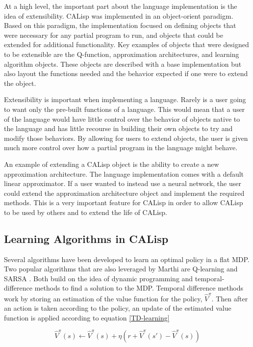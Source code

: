 \documentclass[jair,twoside,11pt,theapa]{article}
\begin{document}
At a high level, the important part about the language implementation is the idea of extensibility. CALisp was implemented in an object-orient paradigm. Based on this paradigm, the implementation focused on defining objects that were necessary for any partial program to run, and objects that could be extended for additional functionality. Key examples of objects that were designed to be extensible are the Q-function, approximation architectures, and learning algorithm objects. These objects are described with a base implementation but also layout the functions needed and the behavior expected if one were to extend the object. 

Extensibility is important when implementing a language. Rarely is a user going to want only the pre-built functions of a language. This would mean that a user of the language would have little control over the behavior of objects native to the language and has little recourse in building their own objects to try and modify those behaviors. By allowing for users to extend objects, the user is given much more control over how a partial program in the language might behave. 

An example of extending a CALisp object is the ability to create a new approximation architecture. The language implementation comes with a default linear approximator. If a user wanted to instead use a neural network, the user could extend the approximation architecture object and implement the required methods. This is a very important feature for CALisp in order to allow CALisp to be used by others and to extend the life of CALisp. 

\subsection{Learning Algorithms in CALisp}
\label{Learning}
Several algorithms have been developed to learn an optimal policy in a flat MDP. Two popular algorithms that are also leveraged by Marthi are Q-learning \cite{Watkins:1992} and SARSA \cite{Sutton:1998}. Both build on the idea of dynamic programming and temporal-difference methods to find a solution to the MDP. Temporal difference methods work by storing an estimation of the value function for the policy, $\hat{V}^{\pi}$. Then after an action is taken according to the policy, an update of the estimated value function is applied according to equation \ref{TD-learning}

\begin{equation}
\label{TD-learning}
\hat{V}^{\pi}(s) \leftarrow \hat{V}^{\pi}(s) + \eta(r + \hat{V}^{\pi}(s') - \hat{V}^{\pi}(s))
\end{equation}
\end{document}
